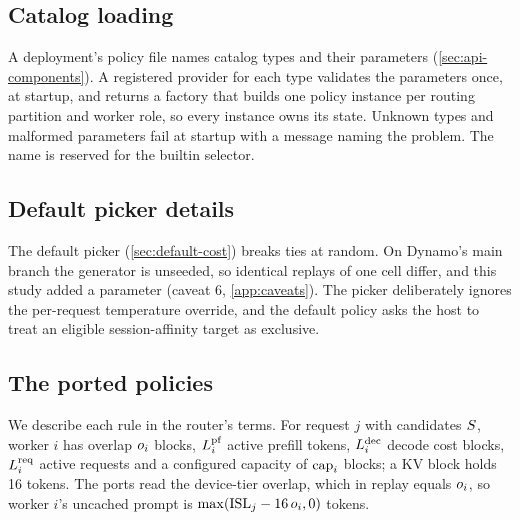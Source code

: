 \subsection{Catalog loading}

A deployment's policy file names catalog types and their parameters (\cref{sec:api-components}). A
registered provider for each type validates the parameters once, at startup, and returns a factory
that builds one policy instance per routing partition and worker role, so every instance owns its
state. Unknown types and malformed parameters fail at startup with a message naming the problem.
The name  is reserved for the builtin selector.

\subsection{Default picker details}

The default picker (\cref{sec:default-cost}) breaks ties at random. On Dynamo's main branch the
generator is unseeded, so identical replays of one cell differ, and this study added a 
parameter (caveat 6, \cref{app:caveats}). The picker deliberately ignores the per-request temperature
override, and the default policy asks the host to treat an eligible session-affinity target as
exclusive.

\subsection{The ported policies}
\label{app:ports}

We describe each rule in the router's terms. For request $j$ with candidates $S$, worker $i$
has overlap $o_i$ blocks, $L^{\mathrm{pf}}_i$ active prefill tokens, $L^{\mathrm{dec}}_i$ decode cost blocks, $L^{\mathrm{req}}_i$
active requests and a configured capacity of $\mathrm{cap}_i$ blocks; a KV block holds 16 tokens. The
ports read the device-tier overlap, which in replay equals $o_i$, so worker $i$'s uncached prompt
is $\max(\mathrm{ISL}_j - 16\,o_i, 0)$ tokens.

